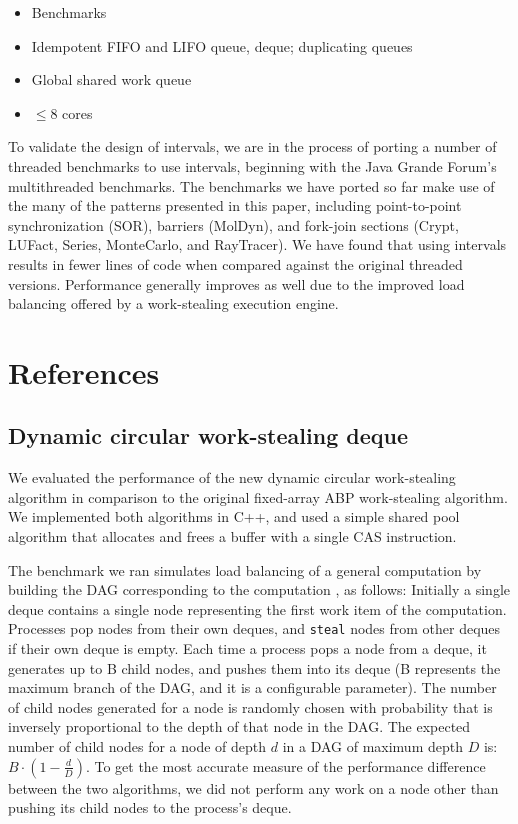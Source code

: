 \begin{itemize}
\item Benchmarks
\item Idempotent FIFO and LIFO queue, deque; duplicating queues
\item Global shared work queue
\item $\le 8$ cores
\end{itemize}

To validate the design of intervals, we are in the process of porting
a number of threaded benchmarks to use intervals, beginning with the
Java Grande Forum's multithreaded benchmarks. The benchmarks we have
ported so far make use of the many of the patterns presented in this
paper, including point-to-point synchronization (SOR), barriers
(MolDyn), and fork-join sections (Crypt, LUFact, Series, MonteCarlo,
and RayTracer). We have found that using intervals results in fewer
lines of code when compared against the original threaded
versions. Performance generally improves as well due to the improved
load balancing offered by a work-stealing execution engine.

\section{References}

\subsection{Dynamic circular work-stealing deque \cite{Chase2005}}

We evaluated the performance of the new dynamic circular work-stealing
algorithm in comparison to the original fixed-array ABP work-stealing
algorithm. We implemented both algorithms in C++, and used a simple
shared pool algorithm that allocates and frees a buffer with a single
CAS instruction.

The benchmark we ran simulates load balancing of a general computation
by building the DAG corresponding to the computation
\cite{Blumofe1999}, as follows: Initially a single deque contains a
single node representing the first work item of the
computation. Processes pop nodes from their own deques, and
\lstinline!steal! nodes from other deques if their own deque is
empty. Each time a process pops a node from a deque, it generates up
to B child nodes, and pushes them into its deque (B represents the
maximum branch of the DAG, and it is a configurable parameter). The
number of child nodes generated for a node is randomly chosen with
probability that is inversely proportional to the depth of that node
in the DAG. The expected number of child nodes for a node of depth $d$
in a DAG of maximum depth $D$ is: $B \cdot \left(1 - \frac{d}{D}
\right)$. To get the most accurate measure of the performance
difference between the two algorithms, we did not perform any work on
a node other than pushing its child nodes to the process's deque.

